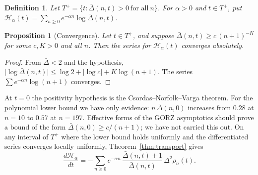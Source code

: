 \documentclass[11pt,a4paper]{article}
\newtheorem{proposition}{Proposition}
\newtheorem{definition}{Definition}
\theoremstyle{remark}
\begin{document}
\begin{definition}
Let $T^+=\{t:\bar\Delta(n,t)>0\ \text{for all}\ n\}$. For $\alpha>0$ and
$t\in T^+$, put
$\displaystyle\mathcal H_\alpha(t)=\sum_{n\ge0}e^{-\alpha n}\log\bar\Delta(n,t)$.
\end{definition}

\begin{proposition}[Convergence]\label{prop:conv}
Let $t\in T^+$, and suppose $\bar\Delta(n,t)\ge c\,(n+1)^{-K}$ for some
$c,K>0$ and all $n$. Then the series for $\mathcal H_\alpha(t)$ converges
absolutely.
\end{proposition}
\begin{proof}
From $\bar\Delta<2$ and the hypothesis,
$\lvert\log\bar\Delta(n,t)\rvert\le\log2+\lvert\log c\rvert+K\log(n+1)$.
The series $\sum e^{-\alpha n}\log(n+1)$ converges.
\end{proof}

At $t=0$ the positivity hypothesis is the Csordas--Norfolk--Varga theorem.
For the polynomial lower bound we have only evidence:
$n\,\bar\Delta(n,0)$ increases from $0.28$ at $n=10$ to $0.57$ at $n=197$.
Effective forms of the GORZ asymptotics should prove a bound of the form
$\bar\Delta(n,0)\ge c/(n+1)$; we have not carried this out. On any
interval of $T^+$ where the lower bound holds uniformly and the
differentiated series converges locally uniformly,
Theorem~\ref{thm:transport} gives
\begin{equation}
\frac{d\mathcal H_\alpha}{dt}
=-\sum_{n\ge0}e^{-\alpha n}\,\frac{\bar\Delta(n,t)+1}{\bar\Delta(n,t)}\,
\Delta^2\rho_n(t).
\end{equation}
\end{document}

